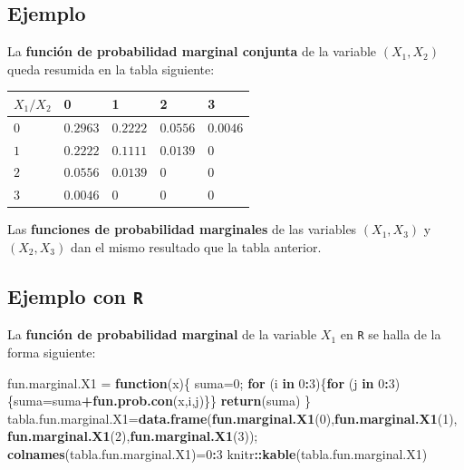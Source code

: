\documentclass[]{book}
\newenvironment{Shaded}{\begin{snugshade}}{\end{snugshade}}
\newcommand{\ControlFlowTok}[1]{\textcolor[rgb]{0.13,0.29,0.53}{\textbf{#1}}}
\newcommand{\DecValTok}[1]{\textcolor[rgb]{0.00,0.00,0.81}{#1}}
\newcommand{\KeywordTok}[1]{\textcolor[rgb]{0.13,0.29,0.53}{\textbf{#1}}}
\newcommand{\NormalTok}[1]{#1}
\newcommand{\OperatorTok}[1]{\textcolor[rgb]{0.81,0.36,0.00}{\textbf{#1}}}
\newcommand{\StringTok}[1]{\textcolor[rgb]{0.31,0.60,0.02}{#1}}
\begin{document}
\hypertarget{ejemplo-96}{%
\subsection{Ejemplo}\label{ejemplo-96}}

La \textbf{función de probabilidad marginal conjunta} de la variable \((X_1,X_2)\) queda resumida en la tabla siguiente:

\begin{longtable}[]{@{}lllll@{}}
\toprule
\(X_1/X_2\) & 0 & 1 & 2 & 3\tabularnewline
\midrule
\endhead
\(0\) & \(0.2963\) & \(0.2222\) & \(0.0556\) & \(0.0046\)\tabularnewline
\(1\) & \(0.2222\) & \(0.1111\) & \(0.0139\) & \(0\)\tabularnewline
\(2\) & \(0.0556\) & \(0.0139\) & \(0\) & \(0\)\tabularnewline
\(3\) & \(0.0046\) & \(0\) & \(0\) & \(0\)\tabularnewline
\bottomrule
\end{longtable}

Las \textbf{funciones de probabilidad marginales} de las variables \((X_1,X_3)\) y \((X_2,X_3)\) dan el mismo resultado que la tabla anterior.

\hypertarget{ejemplo-con-r-18}{%
\subsection{\texorpdfstring{Ejemplo con \texttt{R}}{Ejemplo con R}}\label{ejemplo-con-r-18}}

La \textbf{función de probabilidad marginal} de la variable \(X_1\) en \texttt{R} se halla de la forma siguiente:

\begin{Shaded}
\begin{Highlighting}[]
\NormalTok{fun.marginal.X1 =}\StringTok{ }\ControlFlowTok{function}\NormalTok{(x)\{}
\NormalTok{  suma=}\DecValTok{0}\NormalTok{;}
  \ControlFlowTok{for}\NormalTok{ (i }\ControlFlowTok{in} \DecValTok{0}\OperatorTok{:}\DecValTok{3}\NormalTok{)\{}\ControlFlowTok{for}\NormalTok{ (j }\ControlFlowTok{in} \DecValTok{0}\OperatorTok{:}\DecValTok{3}\NormalTok{)\{suma=suma}\OperatorTok{+}\KeywordTok{fun.prob.con}\NormalTok{(x,i,j)\}\}}
  \KeywordTok{return}\NormalTok{(suma)}
\NormalTok{\}}
\NormalTok{tabla.fun.marginal.X1=}\KeywordTok{data.frame}\NormalTok{(}\KeywordTok{fun.marginal.X1}\NormalTok{(}\DecValTok{0}\NormalTok{),}\KeywordTok{fun.marginal.X1}\NormalTok{(}\DecValTok{1}\NormalTok{),}
                            \KeywordTok{fun.marginal.X1}\NormalTok{(}\DecValTok{2}\NormalTok{),}\KeywordTok{fun.marginal.X1}\NormalTok{(}\DecValTok{3}\NormalTok{));}
\KeywordTok{colnames}\NormalTok{(tabla.fun.marginal.X1)=}\DecValTok{0}\OperatorTok{:}\DecValTok{3}
\NormalTok{knitr}\OperatorTok{::}\KeywordTok{kable}\NormalTok{(tabla.fun.marginal.X1)}
\end{Highlighting}
\end{Shaded}
\end{document}

